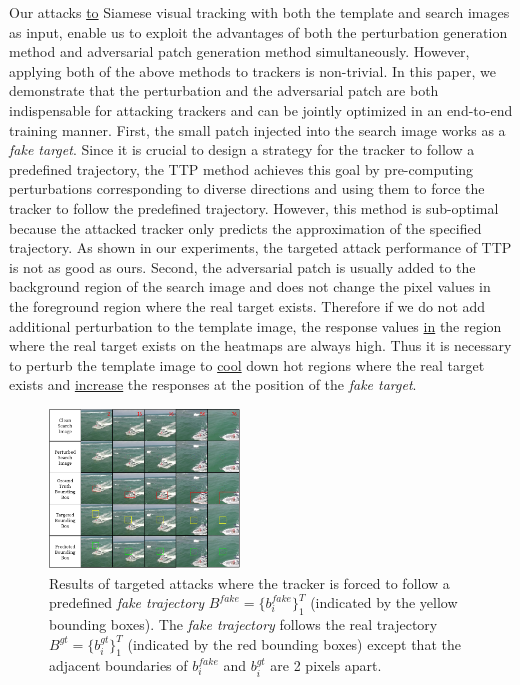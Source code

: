 \documentclass[journal]{IEEEtran}
\begin{document}
Our attacks \uline{to} Siamese visual tracking with both the template and search images as input, enable us to exploit the advantages of both the perturbation generation method \cite{FGSM} and adversarial patch generation method \cite{patch} simultaneously. However, applying both of the above methods to trackers is non-trivial. In this paper, we demonstrate that the perturbation and the adversarial patch are both indispensable for attacking trackers and can be jointly optimized in an end-to-end training manner. First, the small patch injected into the search image works as a \textit{fake target}. Since it is crucial to design a strategy for the tracker to follow a predefined trajectory, the TTP method \cite{TTP} achieves this goal by pre-computing perturbations corresponding to diverse directions and using them to force the tracker to follow the predefined trajectory. However, this method is sub-optimal because the attacked tracker only predicts the approximation of the specified trajectory. As shown in our experiments, the targeted attack performance of TTP is not as good as ours. Second, the adversarial patch is usually added to the background region of the search image and does not change the pixel values in the foreground region where the real target exists. Therefore if we do not add additional perturbation to the template image, the response values \uline{in} the region where the real target exists on the heatmaps are always high. Thus it is necessary to perturb the template image to \uline{cool} down hot regions where the real target exists and \uline{increase} the responses at the position of the \textit{fake target}.
\vspace{-3mm}

\begin{figure}[t]
  \centering
  \includegraphics[width=0.45\textwidth]{images_imperceptible/vis_v7.pdf}
  \caption{Results of targeted attacks where the tracker is forced to follow a predefined \textit{fake trajectory} $B^{fake}=\{b^{fake}_i\}_1^{T}$ (indicated by the yellow bounding boxes). The \textit{fake trajectory} follows the real trajectory $B^{gt}=\{b^{gt}_i\}_1^T$ (indicated by the red bounding boxes) except that the adjacent boundaries of $b^{fake}_i$ and $b^{gt}_i$ are 2 pixels apart.}
  \label{fig:vis1}
  \vspace{-3mm}
\end{figure}
\end{document}

